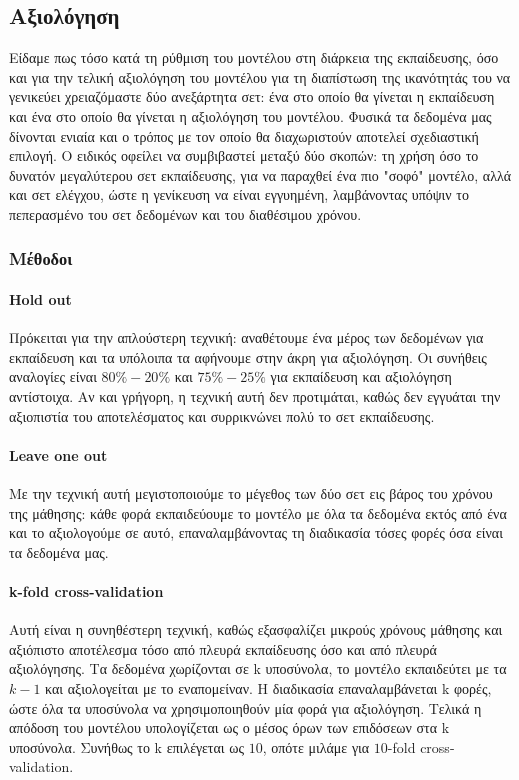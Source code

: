 \subsection{Αξιολόγηση}
Είδαμε πως τόσο κατά τη ρύθμιση του μοντέλου στη διάρκεια της εκπαίδευσης, όσο και για την τελική αξιολόγηση του μοντέλου για τη διαπίστωση της ικανότητάς του να γενικεύει χρειαζόμαστε δύο ανεξάρτητα σετ: ένα στο οποίο θα γίνεται η εκπαίδευση και ένα στο οποίο θα γίνεται η αξιολόγηση του μοντέλου. Φυσικά τα δεδομένα μας δίνονται ενιαία και ο τρόπος με τον οποίο θα διαχωριστούν αποτελεί σχεδιαστική επιλογή. O ειδικός οφείλει να συμβιβαστεί μεταξύ δύο σκοπών: τη
χρήση όσο το δυνατόν μεγαλύτερου σετ εκπαίδευσης, για να παραχθεί ένα πιο "σοφό" μοντέλο, αλλά και σετ ελέγχου, ώστε η γενίκευση να είναι εγγυημένη, λαμβάνοντας υπόψιν το πεπερασμένο του σετ δεδομένων και του διαθέσιμου χρόνου.
\subsubsection{Μέθοδοι} \label{section:eval}
\paragraph{Hold out} Πρόκειται για την απλούστερη τεχνική: αναθέτουμε ένα μέρος των δεδομένων για εκπαίδευση και τα υπόλοιπα τα αφήνουμε στην άκρη για αξιολόγηση. Οι συνήθεις αναλογίες είναι $80\%-20\%$ και $75\%-25\%$ για εκπαίδευση και αξιολόγηση αντίστοιχα. Αν και γρήγορη, η τεχνική αυτή δεν προτιμάται, καθώς δεν εγγυάται την αξιοπιστία του αποτελέσματος και συρρικνώνει πολύ το σετ εκπαίδευσης.
\paragraph{Leave one out} Με την τεχνική αυτή μεγιστοποιούμε το μέγεθος των δύο σετ εις βάρος του χρόνου της μάθησης: κάθε φορά εκπαιδεύουμε το μοντέλο με όλα τα δεδομένα εκτός από ένα και το αξιολογούμε σε αυτό, επαναλαμβάνοντας τη διαδικασία τόσες φορές όσα είναι τα δεδομένα μας.
\paragraph{k-fold cross-validation}Αυτή είναι η συνηθέστερη τεχνική, καθώς εξασφαλίζει μικρούς χρόνους μάθησης και αξιόπιστο αποτέλεσμα τόσο από πλευρά εκπαίδευσης όσο και από πλευρά αξιολόγησης. Τα δεδομένα χωρίζονται σε k υποσύνολα, το μοντέλο εκπαιδεύτει με τα $k-1$ και αξιολογείται με το εναπομείναν. Η διαδικασία επαναλαμβάνεται k φορές, ώστε όλα τα υποσύνολα να χρησιμοποιηθούν μία φορά για
αξιολόγηση. Τελικά η απόδοση του μοντέλου υπολογίζεται ως ο μέσος όρων των επιδόσεων στα k υποσύνολα. Συνήθως το k επιλέγεται ως $10$, οπότε μιλάμε για $10$-fold cross-validation. 
